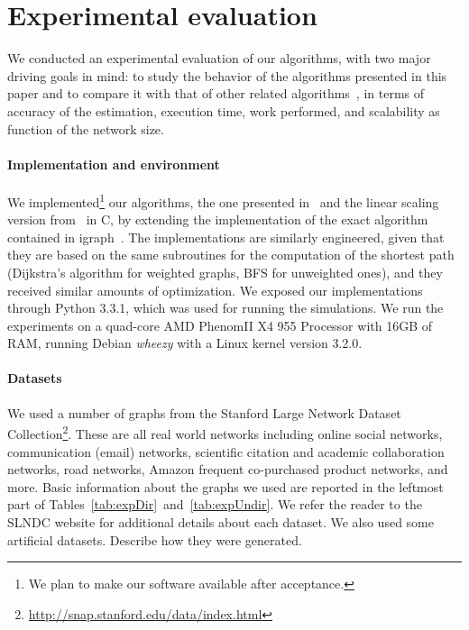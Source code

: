 \section{Experimental evaluation}\label{sec:exper}
We conducted an experimental evaluation of our algorithms, with two major
driving goals in mind: to study the behavior of the algorithms presented in this
paper and to compare it with that of other related
algorithms~\citep{Brandes01,BrandesP07,JacobKLPT05,GeisbergerSS08}, in terms of
accuracy of the estimation, execution time, work performed, and scalability as
function of the network size. 

\paragraph{Implementation and environment}
We implemented\footnote{We plan to make our software available after
acceptance.} our algorithms, the one presented in~\citep{BrandesP07,JacobKLPT05}
and the linear scaling version from~\citep{GeisbergerSS08} in C, by extending
the implementation of the exact algorithm~\citep{Brandes01} contained in
igraph~\citep{igraph}. The implementations are similarly engineered, given that
they are based on the same subroutines for the computation of the shortest path
(Dijkstra's algorithm for weighted graphs, BFS for unweighted ones), and they
received similar amounts of optimization. We exposed our implementations through
Python 3.3.1, which was used for running the simulations. We run the experiments
on a quad-core AMD Phenom\texttrademark II X4 955 Processor with 16GB of RAM,
running Debian \emph{wheezy} with a Linux kernel version 3.2.0.

\paragraph{Datasets} We used a number of graphs from the Stanford Large
Network Dataset
Collection\footnote{\url{http://snap.stanford.edu/data/index.html}}. These are
all real world networks including online social networks, communication (email)
networks, scientific citation and academic collaboration networks, road
networks, Amazon frequent co-purchased product networks, and more. Basic
information about the graphs we used are reported in the leftmost part of
Tables~\ref{tab:expDir}~and~\ref{tab:expUndir}. We refer the
reader to the SLNDC website for additional details about each dataset. \XXX We
also used some artificial datasets. Describe how they were generated.

